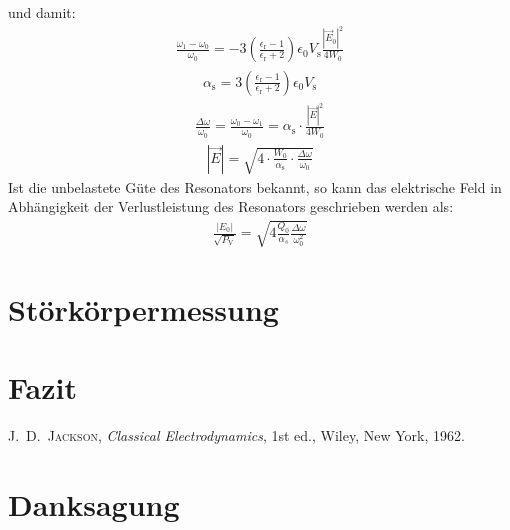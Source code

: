 \documentclass[11pt, a4paper]{scrbook}
\newcommand{\ve}{\vec{E}}
\begin{document}
	und damit:
	\begin{align}
		\frac{\omega_1 - \omega_0}{\omega_0} = - 3 \left( \frac{\epsilon_\mathrm{r} - 1}{\epsilon_\mathrm{r} + 2} \right) \epsilon_0 V_\mathrm{s} \frac{|\ve_0|^2}{4 W_0}
	\end{align}
	\begin{align}
		\alpha_\mathrm{s} = 3 \left( \frac{\epsilon_\mathrm{r} - 1}{\epsilon_\mathrm{r} + 2} \right) \epsilon_0 V_\mathrm{s}
	\end{align}
	\begin{align}
		\frac{\Delta \omega}{\omega_0} = \frac{\omega_0 - \omega_1}{\omega_0} = \alpha_\mathrm{s} \cdot \frac{|\ve|^2}{4 W_0}
	\end{align}
	\begin{align}
		|\ve| = \sqrt{4 \cdot \frac{W_0}{\alpha_\mathrm{s}} \cdot \frac{\Delta \omega}{\omega_0}}
	\end{align}
	Ist die unbelastete Güte des Resonators bekannt, so kann das elektrische Feld in Abhängigkeit der Verlustleistung des Resonators geschrieben werden als:
	\begin{align}
		\frac{|E_0|}{\sqrt{P_\mathrm{V}}} = \sqrt{4 \frac{Q_0}{\alpha_s} \frac{\Delta \omega}{\omega_0^2}}
	\end{align}
	
	
	\chapter{Störkörpermessung}
	
	\chapter{Fazit}
	
	\backmatter
		
	\begin{thebibliography}{19}
		\textsc{J.\ D.\ Jackson},
		\emph{Classical Electrodynamics}, 1st ed.,
		Wiley, New York, 1962.
	
	\end{thebibliography}
	
	\chapter{Danksagung}
	
	\listoffigures
	\listoftables
	
\end{document}
